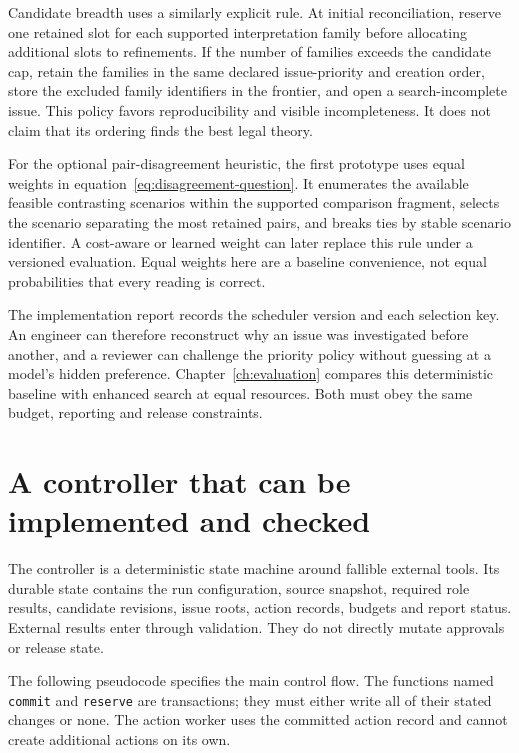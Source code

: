 \documentclass[12pt,a4paper,oneside,openany]{book}
\begin{document}
Candidate breadth uses a similarly explicit rule. At initial reconciliation,
reserve one retained slot for each supported interpretation family before
allocating additional slots to refinements. If the number of families exceeds the
candidate cap, retain the families in the same declared issue-priority and
creation order, store the excluded family identifiers in the frontier, and open
a search-incomplete issue. This policy favors reproducibility and visible
incompleteness. It does not claim that its ordering finds the best legal theory.

For the optional pair-disagreement heuristic, the first prototype uses equal
weights in equation~\eqref{eq:disagreement-question}. It enumerates the available
feasible contrasting scenarios within the supported comparison fragment, selects
the scenario separating the most retained pairs, and breaks ties by stable
scenario identifier. A cost-aware or learned weight can later replace this rule
under a versioned evaluation. Equal weights here are a baseline convenience,
not equal probabilities that every reading is correct.

The implementation report records the scheduler version and each selection key.
An engineer can therefore reconstruct why an issue was investigated before
another, and a reviewer can challenge the priority policy without guessing at a
model's hidden preference. Chapter~\ref{ch:evaluation} compares this deterministic
baseline with enhanced search at equal resources. Both must obey the same budget,
reporting and release constraints.

\section{A controller that can be implemented and checked}

The controller is a deterministic state machine around fallible external tools.
Its durable state contains the run configuration, source snapshot, required role
results, candidate revisions, issue roots, action records, budgets and report
status. External results enter through validation. They do not directly mutate
approvals or release state.

The following pseudocode specifies the main control flow. The functions named
\texttt{commit} and \texttt{reserve} are transactions; they must either write all
of their stated changes or none. The action worker uses the committed action
record and cannot create additional actions on its own.
\end{document}
